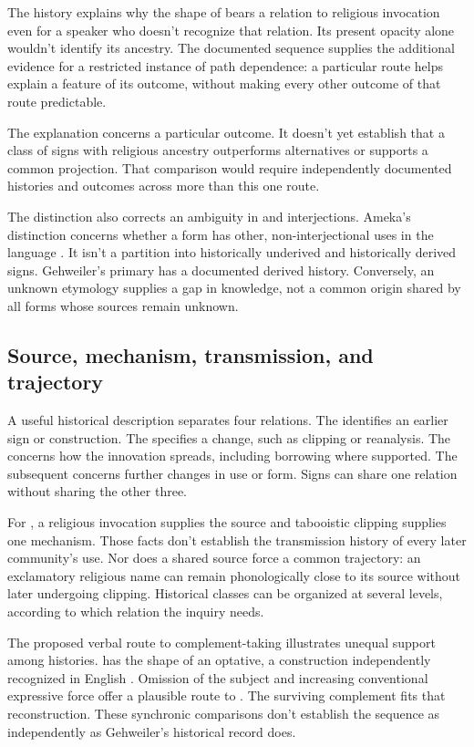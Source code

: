 \documentclass[12pt]{article}
\begin{document}
The history explains why the shape of  bears a relation
to religious invocation even for a speaker who doesn't recognize that
relation. Its present opacity alone wouldn't identify its ancestry.
The documented sequence supplies the additional evidence for a
restricted instance of path dependence: a particular route helps explain
a feature of its outcome, without making every other outcome of that
route predictable.

The explanation concerns a particular outcome. It doesn't yet establish
that a class of signs with religious ancestry outperforms alternatives
or supports a common projection. That comparison would require independently
documented histories and outcomes across more than this one route.

The distinction also corrects an ambiguity in  and
 interjections. Ameka's distinction concerns whether
a form has other, non-interjectional uses in the language
\citep[105--106]{ameka1992}. It isn't a partition into historically
underived and historically derived signs. Gehweiler's primary
 has a documented derived history. Conversely, an unknown
etymology supplies a gap in knowledge, not a common origin shared by
all forms whose sources remain unknown.

\subsection{Source, mechanism, transmission, and trajectory}

A useful historical description separates four relations. The
 identifies an earlier sign or construction. The
 specifies a change, such as clipping or reanalysis.
The  concerns how the innovation spreads,
including borrowing where supported. The subsequent 
concerns further changes in use or form. Signs can share one relation
without sharing the other three.

For , a religious invocation supplies the source and
tabooistic clipping supplies one mechanism. Those facts don't establish
the transmission history of every later community's use. Nor does a
shared source force a common trajectory: an exclamatory religious name
can remain phonologically close to its source without later undergoing
clipping. Historical classes can be organized at several
levels, according to which relation the inquiry needs.

The proposed verbal route to complement-taking  illustrates
unequal support among histories.  has the shape
of an optative, a construction independently recognized in English
\citep[944]{HuddlestonPullum2002}. Omission of the subject and increasing
conventional expressive force offer a plausible route to . The surviving complement fits that reconstruction. These synchronic
comparisons don't establish the sequence as independently as Gehweiler's
historical record does.
\end{document}
